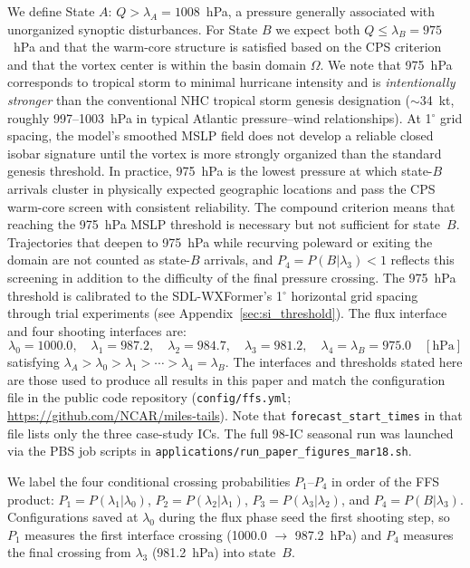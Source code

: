 \documentclass[11pt]{article}
\begin{document}
We define State $A$: $Q > \lambda_A = 1008$~hPa, a pressure generally associated with unorganized synoptic disturbances.
For State $B$ we expect both $Q \leq \lambda_B = 975$~hPa and that the warm-core structure is satisfied based on the CPS criterion and that the vortex center is within the basin domain $\Omega$.
We note that 975~hPa corresponds to tropical storm to minimal hurricane intensity and is \textit{intentionally stronger} than the conventional NHC tropical storm genesis designation
($\sim$34~kt, roughly 997--1003~hPa in typical Atlantic pressure--wind relationships).
At 1$^\circ$ grid spacing, the model's smoothed MSLP field does not develop a reliable closed
isobar signature until the vortex is more strongly organized than the standard genesis threshold.
In practice, 975~hPa is the lowest pressure at which state-$B$ arrivals cluster in physically expected
geographic locations and pass the CPS warm-core screen with consistent reliability.
The compound criterion means that reaching the 975~hPa MSLP threshold is necessary but not sufficient
for state~$B$. Trajectories that deepen to 975~hPa while recurving poleward or exiting the domain
are not counted as state-$B$ arrivals, and $P_4 = P(B|\lambda_3) < 1$ reflects this screening
in addition to the difficulty of the final pressure crossing.
The 975~hPa threshold is calibrated to the SDL-WXFormer's 1$^\circ$ horizontal
grid spacing through trial experiments (see Appendix~\ref{sec:si_threshold}).
The flux interface and four shooting interfaces are:
\begin{equation*}
\lambda_0 = 1000.0,\quad
\lambda_1 = 987.2,\quad
\lambda_2 = 984.7,\quad
\lambda_3 = 981.2,\quad
\lambda_4 = \lambda_B = 975.0 \quad [\text{hPa}]
\end{equation*}
satisfying $\lambda_A > \lambda_0 > \lambda_1 > \cdots > \lambda_4 = \lambda_B$.
The interfaces and thresholds stated here are those used to produce all results in this paper
and match the configuration file in the public code repository
(\texttt{config/ffs.yml}; \url{https://github.com/NCAR/miles-tails}).
Note that \texttt{forecast\_start\_times} in that file lists only the three case-study ICs.
The full 98-IC seasonal run was launched via the PBS job scripts in
\texttt{applications/run\_paper\_figures\_mar18.sh}.


We label the four conditional crossing probabilities $P_1$--$P_4$ in order of the
FFS product: $P_1 = P(\lambda_1|\lambda_0)$, $P_2 = P(\lambda_2|\lambda_1)$,
$P_3 = P(\lambda_3|\lambda_2)$, and $P_4 = P(B|\lambda_3)$.
Configurations saved at $\lambda_0$ during the flux phase seed the first shooting
step, so $P_1$ measures the first interface crossing
(1000.0 $\to$ 987.2~hPa) and $P_4$ measures the final crossing from
$\lambda_3$ (981.2~hPa) into state~$B$.
\end{document}
